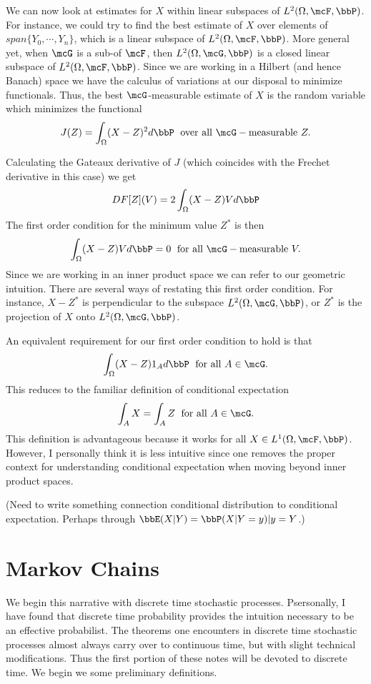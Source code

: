\documentclass{report}
\begin{document}
We can now look at estimates for $X$ within linear subspaces of $L^2(\Omega, \mcF, \bbP)$.  For instance, we could try to find the best estimate of $X$ over elements of $span \{Y_0, \cdots, Y_n\}$, which is a linear subspace of $L^2(\Omega, \mcF, \bbP)$.  
More general yet, when $\mcG$ is a sub-\sigalg of $\mcF$, then $L^2(\Omega, \mcG, \bbP)$ is a closed linear subspace of $L^2(\Omega, \mcF, \bbP)$.  Since we are working in a Hilbert (and hence Banach) space we have the calculus of variations at our disposal to minimize functionals.  Thus, the best $\mcG$-measurable estimate of $X$ is the random variable which minimizes the functional
\[
J(Z) = \int_\Omega (X - Z)^2 d \bbP \; \textmd{ over all } \mcG-\textmd{measurable } Z.
\]

Calculating the Gateaux derivative of $J$ (which coincides with the Frechet derivative in this case) we get
\[
DF[Z](V) = 2 \int_\Omega (X-Z) V d \bbP
\]
The first order condition for the minimum value $Z^*$ is then
\[
\int_\Omega (X - Z) V d \bbP = 0 \; \textmd{ for all } \mcG-\textmd{measurable } V.
\]
Since we are working in an inner product space we can refer to our geometric intuition.  There are several ways of restating this first order condition.  For instance, $X-Z^*$ is perpendicular to the subspace $L^2(\Omega, \mcG, \bbP)$, or $Z^*$ is the projection of $X$ onto $L^2(\Omega, \mcG, \bbP)$.

An equivalent requirement for our first order condition to hold is that
\[
\int_\Omega (X - Z) 1_A d \bbP \; \textmd{ for all } A \in \mcG.
\]
This reduces to the familiar definition of conditional expectation
\[
\int_A X = \int_A Z \; \textmd{ for all } A \in \mcG.
\]
This definition is advantageous because it works for all $X \in L^1(\Omega, \mcF, \bbP)$.  However, I personally think it is less intuitive since one removes the proper context for understanding conditional expectation when moving beyond inner product spaces.

(Need to write something connection conditional distribution to conditional expectation.  Perhaps through $\bbE(X|Y) = \bbP(X|Y=y)|y=Y$.)

\chapter{Markov Chains}

We begin this narrative with discrete time stochastic processes.  Psersonally, I have found that discrete time probability provides the intuition necessary to be an effective probabilist.  The theorems one encounters in discrete time stochastic processes almost always carry over to continuous time, but with slight technical modifications.  Thus the first portion of these notes will be devoted to discrete time.  We begin we some preliminary definitions.
\end{document}
